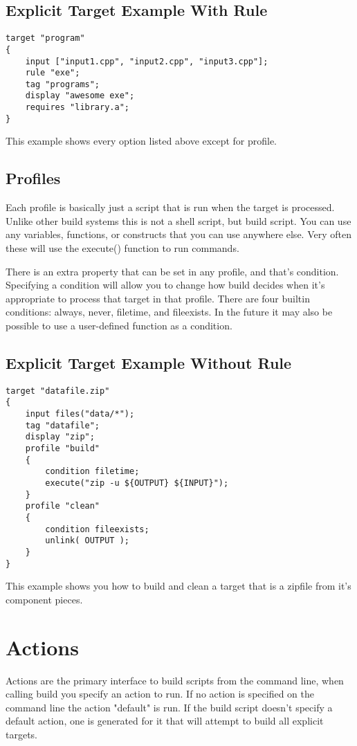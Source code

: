 \documentclass[letterpaper]{book}
\begin{document}
\subsection{Explicit Target Example With Rule}
\begin{lstlisting}
target "program"
{
    input ["input1.cpp", "input2.cpp", "input3.cpp"];
    rule "exe";
    tag "programs";
    display "awesome exe";
    requires "library.a";
}
\end{lstlisting}
This example shows every option listed above except for profile.

\subsection{Profiles}
Each profile is basically just a script that is run when the target is
processed.  Unlike other build systems this is not a shell script, but build
script.  You can use any variables, functions, or constructs that you can use
anywhere else.  Very often these will use the execute() function to run
commands.

There is an extra property that can be set in any profile, and that's condition.
Specifying a condition will allow you to change how build decides when it's
appropriate to process that target in that profile.  There are four builtin
conditions: always, never, filetime, and fileexists.  In the future it may also
be possible to use a user-defined function as a condition.


\subsection{Explicit Target Example Without Rule}
\begin{lstlisting}
target "datafile.zip"
{
    input files("data/*");
    tag "datafile";
    display "zip";
    profile "build"
    {
        condition filetime;
        execute("zip -u ${OUTPUT} ${INPUT}");
    }
    profile "clean"
    {
        condition fileexists;
        unlink( OUTPUT );
    }
}
\end{lstlisting}

This example shows you how to build and clean a target that is a zipfile from
it's component pieces.

\section{Actions}
Actions are the primary interface to build scripts from the command line, when
calling build you specify an action to run.  If no action is specified on the
command line the action "default" is run.  If the build script doesn't specify
a default action, one is generated for it that will attempt to build all
explicit targets.
\end{document}
